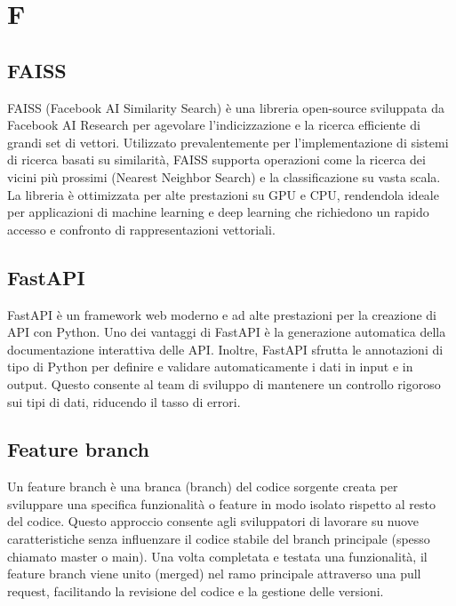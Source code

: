 \section{F}

\vspace{2em}
\subsection*{FAISS}
\par FAISS (Facebook AI Similarity Search) è una libreria open-source sviluppata da Facebook AI Research per agevolare l'indicizzazione e la ricerca efficiente di grandi set di vettori. Utilizzato prevalentemente per l'implementazione di sistemi di ricerca basati su similarità, FAISS supporta operazioni come la ricerca dei vicini più prossimi (Nearest Neighbor Search) e la classificazione su vasta scala. La libreria è ottimizzata per alte prestazioni su GPU e CPU, rendendola ideale per applicazioni di machine learning e deep learning che richiedono un rapido accesso e confronto di rappresentazioni vettoriali.

\vspace{2em}
\subsection*{FastAPI}
\par FastAPI è un framework web moderno e ad alte prestazioni per la creazione di API con Python. Uno dei vantaggi di FastAPI è la generazione automatica della documentazione interattiva delle API. Inoltre, FastAPI sfrutta le annotazioni di tipo di Python per definire e validare automaticamente i dati in input e in output. Questo consente al team di sviluppo di mantenere un controllo rigoroso sui tipi di dati, riducendo il tasso di errori.

\vspace{2em}
\subsection*{Feature branch}
\par Un feature branch è una branca (branch) del codice sorgente creata per sviluppare una specifica funzionalità o feature in modo isolato rispetto al resto del codice. Questo approccio consente agli sviluppatori di lavorare su nuove caratteristiche senza influenzare il codice stabile del branch principale (spesso chiamato master o main). Una volta completata e testata una funzionalità, il feature branch viene unito (merged) nel ramo principale attraverso una pull request, facilitando la revisione del codice e la gestione delle versioni.

